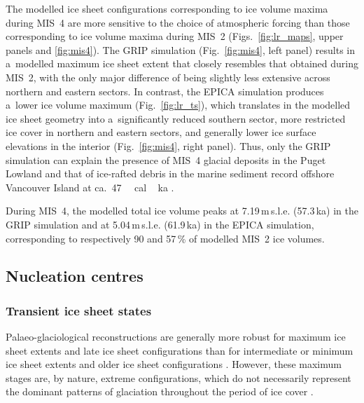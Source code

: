 \documentclass[tc, manuscript]{copernicus}
\begin{document}
      The modelled ice sheet configurations corresponding to ice volume
      maxima during MIS~4 are more sensitive to the choice of atmospheric
      forcing than those corresponding to ice volume maxima during MIS~2
      (Figs.~\ref{fig:lr_maps}, upper panels and \ref{fig:mis4}). The GRIP
      simulation (Fig.~\ref{fig:mis4}, left panel) results in a~modelled
      maximum ice sheet extent that closely resembles that obtained during
      MIS~2, with the only major difference of being slightly less extensive
      across northern and eastern sectors. In contrast, the EPICA simulation
      produces a~lower ice volume maximum (Fig.~\ref{fig:lr_ts}), which
      translates in the modelled ice sheet geometry into a~significantly
      reduced southern sector, more restricted ice cover in northern and
      eastern sectors, and generally lower ice surface elevations in the
      interior (Fig.~\ref{fig:mis4}, right panel). Thus, only the GRIP
      simulation can explain the presence of MIS~4 glacial deposits in the
      Puget Lowland \citep{Troost.2014} and that of ice-rafted debris in the
      marine sediment record offshore Vancouver Island at
      ca.~47\,\unit{\,cal\,ka} \citep{Cosma.etal.2008}.

      During MIS~4, the modelled total ice volume peaks at
      7.19\,\unit{m}\,s.l.e. (57.3\,\unit{ka}) in the GRIP simulation and at
      5.04\,\unit{m}\,s.l.e. (61.9\,\unit{ka}) in the EPICA simulation,
      corresponding to respectively 90 and 57\,\unit{\%} of modelled MIS~2
      ice volumes.

\subsection{Nucleation centres}

\subsubsection{Transient ice sheet states}

      Palaeo-glaciological reconstructions are generally more robust for
      maximum ice sheet extents and late ice sheet configurations than for
      intermediate or minimum ice sheet extents and older ice sheet
      configurations \citep{Kleman.etal.2010}. However, these maximum stages
      are, by nature, extreme configurations, which do not necessarily
      represent the dominant patterns of glaciation throughout the period of
      ice cover \citep{Porter.1989, Kleman.Stroeven.1997, Kleman.etal.2008,
      Kleman.etal.2010}.
\end{document}
